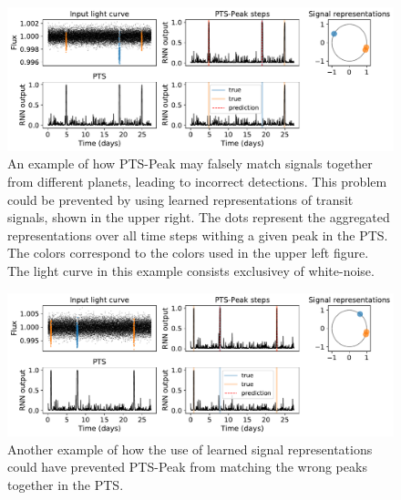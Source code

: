 \begin{figure}
    \centering
    \includegraphics[width=0.85\linewidth]{Experiments/Figures/Cases/sf_multi_peak_repr_3.pdf}
    \caption{An example of how PTS-Peak may falsely match signals together from different planets, leading to incorrect detections. This problem could be prevented by using learned representations of transit signals, shown in the upper right. The dots represent the aggregated representations over all time steps withing a given peak in the PTS. The colors correspond to the colors used in the upper left figure. The light curve in this example consists exclusivey of white-noise.}
    \label{fig:sf_repr_3}
\end{figure}


\begin{figure}
    \centering
    \includegraphics[width=0.85\linewidth]{Experiments/Figures/Cases/sf_multi_peak_repr_2.pdf}
    \caption{Another example of how the use of learned signal representations could have prevented PTS-Peak from matching the wrong peaks together in the PTS.}
    \label{fig:sf_repr_2}
\end{figure}
